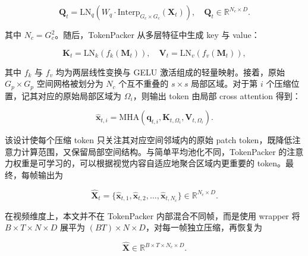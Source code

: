 \begin{equation}
    \label{equ:method-query}
    \mathbf{Q}_t =
    \mathrm{LN}_q
    \left(
        W_q \cdot
        \mathrm{Interp}_{G_c\times G_c}(\mathbf{X}_t)
    \right),
    \quad
    \mathbf{Q}_t \in \mathbb{R}^{N_c\times D}.
\end{equation}

\par 其中 $N_c=G_c^2$。随后，TokenPacker 从多层特征中生成 key 与 value：

\begin{equation}
    \label{equ:method-key-value}
    \mathbf{K}_t = \mathrm{LN}_k(f_k(\mathbf{M}_t)),\quad
    \mathbf{V}_t = \mathrm{LN}_v(f_v(\mathbf{M}_t)),
\end{equation}

\par 其中 $f_k$ 与 $f_v$ 均为两层线性变换与 GELU 激活组成的轻量映射。接着，原始 $G_p\times G_p$ 空间网格被划分为 $N_c$ 个互不重叠的 $s\times s$ 局部区域。对于第 $i$ 个压缩位置，记其对应的原始局部区域为 $\Omega_i$，则输出 token 由局部 cross attention 得到：

\begin{equation}
    \label{equ:method-local-attention}
    \hat{\mathbf{x}}_{t,i}
    =
    \mathrm{MHA}
    \left(
        \mathbf{q}_{t,i},
        \mathbf{K}_{t,\Omega_i},
        \mathbf{V}_{t,\Omega_i}
    \right).
\end{equation}

\par 该设计使每个压缩 token 只关注其对应空间邻域内的原始 patch token，既降低注意力计算范围，又保留局部空间结构。与简单平均池化不同，TokenPacker 的注意力权重是可学习的，可以根据视觉内容自适应地聚合区域内更重要的 token。最终，每帧输出为

\begin{equation}
    \label{equ:method-tokenpacker-output}
    \hat{\mathbf{X}}_t
    =
    \{\hat{\mathbf{x}}_{t,1},\hat{\mathbf{x}}_{t,2},\ldots,\hat{\mathbf{x}}_{t,N_c}\}
    \in \mathbb{R}^{N_c\times D}.
\end{equation}

\par 在视频维度上，本文并不在 TokenPacker 内部混合不同帧，而是使用 wrapper 将 $B\times T\times N\times D$ 展平为 $(BT)\times N\times D$，对每一帧独立压缩，再恢复为

\begin{equation}
    \label{equ:method-video-tokenpacker-output}
    \hat{\mathbf{X}}
    \in
    \mathbb{R}^{B\times T\times N_c\times D}.
\end{equation}


